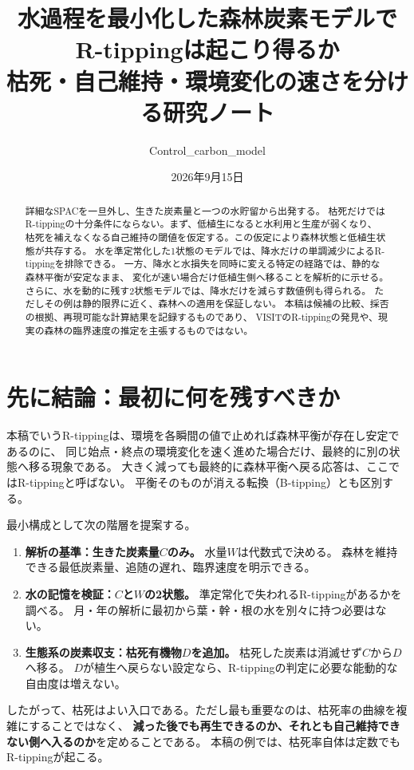 \documentclass[a4paper,11pt]{ltjsarticle}
\title{水過程を最小化した森林炭素モデルで\\R-tippingは起こり得るか\\
\large 枯死・自己維持・環境変化の速さを分ける研究ノート}
\author{Control\_carbon\_model}
\date{2026年9月15日}
\begin{document}
\maketitle
\begin{abstract}
詳細なSPACを一旦外し、生きた炭素量と一つの水貯留から出発する。
枯死だけではR-tippingの十分条件にならない。まず、低植生になると水利用と生産が弱くなり、
枯死を補えなくなる自己維持の閾値を仮定する。この仮定により森林状態と低植生状態が共存する。
水を準定常化した1状態のモデルでは、降水だけの単調減少によるR-tippingを排除できる。
一方、降水と水損失を同時に変える特定の経路では、静的な森林平衡が安定なまま、
変化が速い場合だけ低植生側へ移ることを解析的に示せる。
さらに、水を動的に残す2状態モデルでは、降水だけを減らす数値例も得られる。
ただしその例は静的限界に近く、森林への適用を保証しない。
本稿は候補の比較、採否の根拠、再現可能な計算結果を記録するものであり、
VISITのR-tippingの発見や、現実の森林の臨界速度の推定を主張するものではない。
\end{abstract}
\tableofcontents
\clearpage

\section{先に結論：最初に何を残すべきか}
本稿でいうR-tippingは、環境を各瞬間の値で止めれば森林平衡が存在し安定であるのに、
同じ始点・終点の環境変化を速く進めた場合だけ、最終的に別の状態へ移る現象である。
大きく減っても最終的に森林平衡へ戻る応答は、ここではR-tippingと呼ばない。
平衡そのものが消える転換（B-tipping）とも区別する\cite{ashwin,feudel}。

最小構成として次の階層を提案する。
\begin{enumerate}
\item \textbf{解析の基準：生きた炭素量$C$のみ。} 水量$W$は代数式で決める。
森林を維持できる最低炭素量、追随の遅れ、臨界速度を明示できる。
\item \textbf{水の記憶を検証：$C$と$W$の2状態。} 準定常化で失われるR-tippingがあるかを調べる。
月・年の解析に最初から葉・幹・根の水を別々に持つ必要はない。
\item \textbf{生態系の炭素収支：枯死有機物$D$を追加。} 枯死した炭素は消滅せず$C$から$D$へ移る。
$D$が植生へ戻らない設定なら、R-tippingの判定に必要な能動的な自由度は増えない。
\end{enumerate}
したがって、枯死はよい入口である。ただし最も重要なのは、枯死率の曲線を複雑にすることではなく、
\textbf{減った後でも再生できるのか、それとも自己維持できない側へ入るのか}を定めることである。
本稿の例では、枯死率自体は定数でもR-tippingが起こる。
\end{document}
